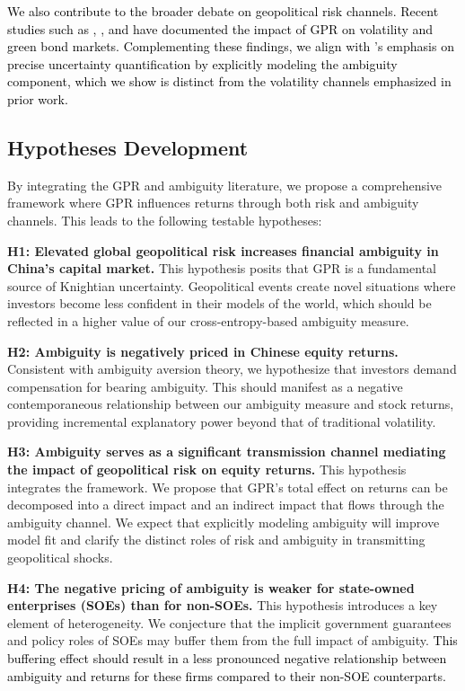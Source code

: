 \documentclass[preprint,12pt,authoryear]{elsarticle}
\begin{document}
\textcolor{black}{We also contribute to the broader debate on geopolitical risk channels. Recent studies such as \citet{Bouri2024}, \citet{Liu2024}, and \citet{Zhang2023} have documented the impact of GPR on volatility and green bond markets. Complementing these findings, we align with \citet{Nemani2023}’s emphasis on precise uncertainty quantification by explicitly modeling the ambiguity component, which we show is distinct from the volatility channels emphasized in prior work.}

\subsection{Hypotheses Development}

By integrating the GPR and ambiguity literature, we propose a comprehensive framework where GPR influences returns through both risk and ambiguity channels. This leads to the following testable hypotheses:

\textbf{H1: Elevated global geopolitical risk increases financial ambiguity in China's capital market.}
This hypothesis posits that GPR is a fundamental source of Knightian uncertainty. Geopolitical events create novel situations where investors become less confident in their models of the world, which should be reflected in a higher value of our cross-entropy-based ambiguity measure.

\textbf{H2: Ambiguity is negatively priced in Chinese equity returns.}
Consistent with ambiguity aversion theory, we hypothesize that investors demand compensation for bearing ambiguity. This should manifest as a negative contemporaneous relationship between our ambiguity measure and stock returns, providing incremental explanatory power beyond that of traditional volatility.

\textbf{H3: Ambiguity serves as a significant transmission channel mediating the impact of geopolitical risk on equity returns.}
This hypothesis integrates the framework. We propose that GPR's total effect on returns can be decomposed into a direct impact and an indirect impact that flows through the ambiguity channel. We expect that explicitly modeling ambiguity will improve model fit and clarify the distinct roles of risk and ambiguity in transmitting geopolitical shocks.

\textbf{H4: The negative pricing of ambiguity is weaker for state-owned enterprises (SOEs) than for non-SOEs.}
This hypothesis introduces a key element of heterogeneity. We conjecture that the implicit government guarantees and policy roles of SOEs may buffer them from the full impact of ambiguity. \textcolor{black}{This buffering effect should result in a less pronounced negative relationship between ambiguity and returns for these firms compared to their non-SOE counterparts.}
\end{document}
